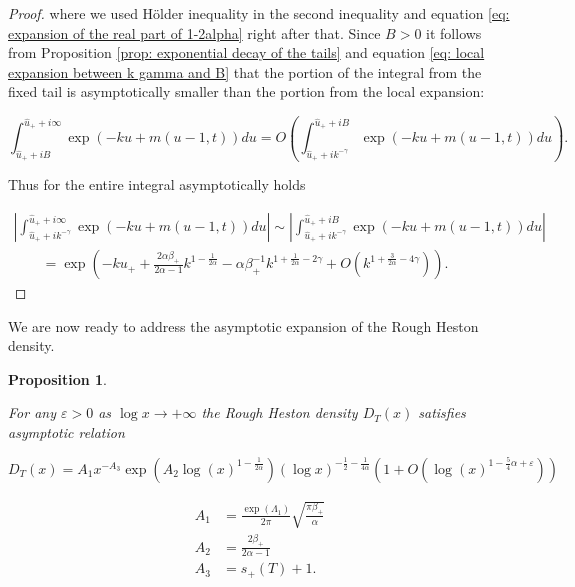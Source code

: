\documentclass[12pt,twoside]{article}
\theoremstyle{plain}
\theoremstyle{plain}
\newtheorem{proposition}{Proposition}[section]
\theoremstyle{definition}
\theoremstyle{remark}
\numberwithin{equation}{section}
\begin{document}
\begin{proof}
where we used H{\"o}lder inequality in the second inequality and equation \eqref{eq: expansion of the real part of 1-2alpha} right after that. Since $B>0$ it follows from Proposition \ref{prop: exponential decay of the tails} and equation \eqref{eq: local expansion between k gamma and B} that the portion of the integral from the fixed tail is asymptotically smaller than the portion from the local expansion: 

$$
\int_{\hat u_+ +i B} ^{\hat u_+ + i \infty} \exp(-ku + m(u-1,t))du = O\left(\int_{\hat u_+ +i k^{-\gamma}} ^{\hat u_+ + i B} \exp(-ku + m(u-1,t))du\right).
$$

\vspace{10pt}

Thus for the entire integral asymptotically holds

$$
\begin{aligned}
\left|\int_{\hat{u}_{+}+i k^{-\gamma}}^{\hat{u}_{+}+i \infty} \exp (-k u+m(u-1, t)) d u\right| \sim \left|\int_{\hat{u}_{+}+i k^{-\gamma}}^{\hat{u}_{+}+i B} \exp (-k u+m(u-1, t)) d u\right| \\[10pt]
\qquad = \exp \left(-k u_{+}+\frac{2 \alpha \beta_{+}}{2 \alpha-1} k^{1-\frac{1}{2 \alpha}} - \alpha \beta_{+}^{-1} k^{1+\frac{1}{2 \alpha}-2 \gamma}+O\left(k^{1+\frac{3}{2 \alpha}-4 \gamma}\right)\right).
\end{aligned}
$$

\end{proof}

\newpage

We are now ready to address the asymptotic expansion of the Rough Heston density.

\begin{proposition}
\label{prop: density main proposition}

For any $\varepsilon>0$ as $\log x \rightarrow + \infty$ the Rough Heston density $D_T(x)$ satisfies asymptotic relation

\begin{equation}
\label{eq: rough heston density expansion} 
D_T(x) = A_1 x^{-A_3} \exp\left(A_2 \log(x) ^{1-\frac{1}{2\alpha}} \right) (\log x) ^ {-\frac 12 -\frac{1}{4\alpha}} \left(1+O(\log(x)^{1-\frac 54 \alpha + \varepsilon})\right) 
\end{equation}

$$
\begin{aligned}
A_1 &= \frac{\exp \left(\Lambda_{1}\right)}{2 \pi} \sqrt {\frac{\pi\beta_+}{\alpha}} \\[10pt]
A_2 &= \frac{2 \beta_+}{2 \alpha-1} \\[10pt]
A_3 &= s_+(T) + 1.
\end{aligned}
$$

\end{proposition}
\end{document}
